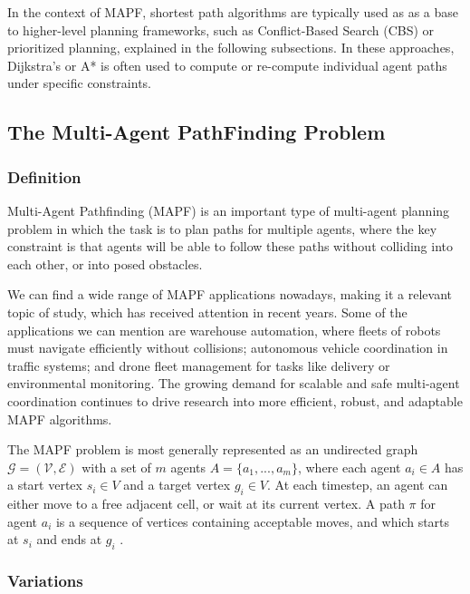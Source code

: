 In the context of MAPF, shortest path algorithms are typically used as as a base to higher-level planning frameworks, such as Conflict-Based Search (CBS) or prioritized planning, explained in the following subsections. In these approaches, Dijkstra’s or A* is often used to compute or re-compute individual agent paths under specific constraints. 

\subsection{The Multi-Agent PathFinding Problem}

\subsubsection{Definition}

Multi-Agent Pathfinding (MAPF) \cite{sternMultiAgentPathfindingDefinitions2019} is an important type of multi-agent planning problem in which the task is to plan paths for multiple agents, where the key constraint is that agents will be able to follow these paths without colliding into each other, or into posed obstacles.

We can find a wide range of MAPF applications nowadays, making it a relevant topic of study, which has received attention in recent years. Some of the applications we can mention are warehouse automation, where fleets of robots must navigate efficiently without collisions; autonomous vehicle coordination in traffic systems; and drone fleet management for tasks like delivery or environmental monitoring. The growing demand for scalable and safe multi-agent coordination continues to drive research into more efficient, robust, and adaptable MAPF algorithms.

The MAPF problem is most generally represented as an undirected graph \( \mathcal{G} = (\mathcal{V}, \mathcal{E}) \) with a set of \(m\) agents \(A = \{a_1,...,a_m\}\), where each agent \(a_i \in A\) has a start vertex \(s_i \in V\) and a target vertex \(g_i \in V\). At each timestep, an agent can either move to a free adjacent cell, or wait at its current vertex. A path \(\pi\) for agent \(a_i\) is a sequence of vertices containing acceptable moves, and which starts at \(s_i\) and ends at \(g_i\) \cite{liAnytimeMultiAgentPath2021}.


\subsubsection{Variations}

